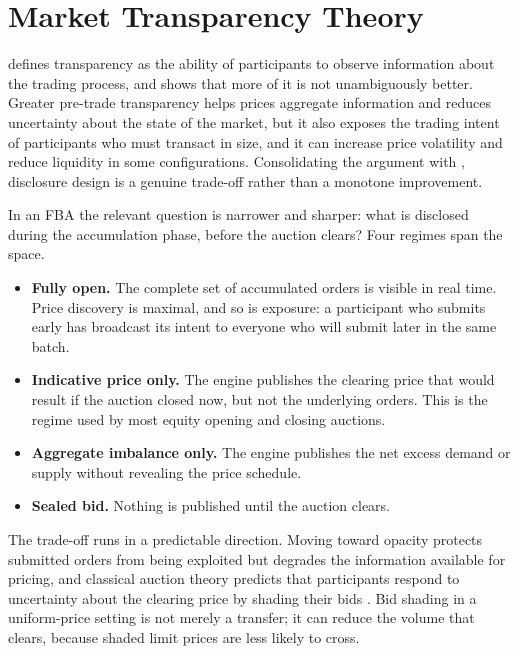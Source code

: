 \section{Market Transparency Theory}
\label{sec:transparency}

\citet{madhavan1996transparency} defines transparency as the ability of
participants to observe information about the trading process, and shows
that more of it is not unambiguously better. Greater pre-trade
transparency helps prices aggregate information and reduces uncertainty
about the state of the market, but it also exposes the trading intent of
participants who must transact in size, and it can increase price
volatility and reduce liquidity in some configurations. Consolidating
the argument with \citet{ohara1995microstructure}, disclosure design is
a genuine trade-off rather than a monotone improvement.

In an FBA the relevant question is narrower and sharper: what is
disclosed during the accumulation phase, before the auction clears? Four
regimes span the space.

\begin{itemize}
  \item \textbf{Fully open.} The complete set of accumulated orders is
  visible in real time. Price discovery is maximal, and so is exposure:
  a participant who submits early has broadcast its intent to everyone
  who will submit later in the same batch.
  \item \textbf{Indicative price only.} The engine publishes the
  clearing price that would result if the auction closed now, but not
  the underlying orders. This is the regime used by most equity opening
  and closing auctions.
  \item \textbf{Aggregate imbalance only.} The engine publishes the net
  excess demand or supply without revealing the price schedule.
  \item \textbf{Sealed bid.} Nothing is published until the auction
  clears.
\end{itemize}

The trade-off runs in a predictable direction. Moving toward opacity
protects submitted orders from being exploited but degrades the
information available for pricing, and classical auction theory predicts
that participants respond to uncertainty about the clearing price by
shading their bids \citep{klemperer1999auction}. Bid shading in a
uniform-price setting is not merely a transfer; it can reduce the volume
that clears, because shaded limit prices are less likely to cross.


